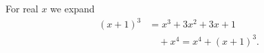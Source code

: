 \documentclass{article}
\begin{document}
For real $x$ we expand
\begin{align}
(x+1)^3 &= x^3 + 3x^2 + 3x + 1 \nonumber\\
&\quad + x^4 = x^4 + (x+1)^3 .
\label{eq:x}
\end{align}
\end{document}
